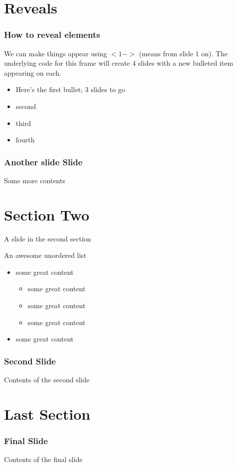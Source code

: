 \documentclass{beamer}
\begin{document}
\section{Reveals}
\begin{frame}
\frametitle{How to reveal elements}
We can make things appear using $<1->$ (means from slide 1 on). The underlying code for this frame will create 4 slides with a new bulleted item appearing on each.
\begin{itemize}
\item<1-> Here's the first bullet; 3 slides to go
\item<2-> second
\item<3-> third
\item<4-> fourth
\end{itemize}
\end{frame}

\begin{frame}
\frametitle{Another slide Slide}
Some more contents
\end{frame}

\section{Section Two}
\begin{frame}{A slide in the second section}
\begin{Large}An awesome unordered list\end{Large}
\begin{itemize}
\item some great content
\begin{itemize}
\item some great content
\item some great content
\item some great content
\end{itemize}
\item some great content
\end{itemize}
\end{frame}

\begin{frame}
\frametitle{Second Slide}
Contents of the second slide
\end{frame}

\section{Last Section}
\begin{frame}
\frametitle{Final Slide}
Contents of the final slide
\end{frame}
\end{document}
